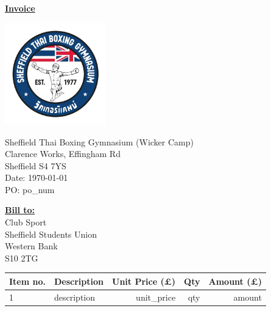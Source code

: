 \documentclass[11pt]{article}
\begin{document}
    \begin{center}
        \Large\textbf{\underline{Invoice}}
    \end{center}

    \noindent
    \includegraphics[width=0.33\textwidth]{../data/logo.jpg}


    \vspace{-2cm} %
    \begin{flushright}
        Sheffield Thai Boxing Gymnasium (Wicker Camp) \\
        Clarence Works, Effingham Rd \\
        Sheffield S4 7YS \\
        Date: \today{} \\
        PO: {{ po_num }}
    \end{flushright}

    \vspace{1cm} %

    \noindent \textbf{\underline{Bill to:}} \\
    Club Sport \\
    Sheffield Students Union \\
    Western Bank \\
    S10 2TG

    \vspace{1cm}

    \begin{longtable}{@{} l p{} r r r @{}}
        \toprule
        \textbf{Item no.} & \textbf{Description} & \textbf{Unit Price (£)} & \textbf{Qty} & \textbf{Amount (£)} \\
        \midrule
        \endhead
        1 & \parbox[t]{0.5\textwidth}{\raggedright {{ description }}\strut} & {{ unit_price }} & {{ qty }} & {{ amount }} \\
        \bottomrule
    \end{longtable}
\end{document}
